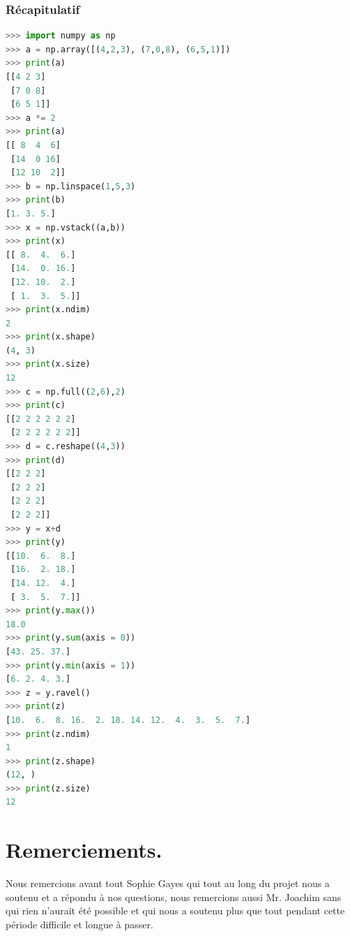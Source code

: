 \documentclass[a4paper, 12pt]{article}
\numberwithin{equation}{subsection}
\begin{document}
\subsubsection{Récapitulatif}
\begin{lstlisting}[language=Python]
>>> import numpy as np
>>> a = np.array([(4,2,3), (7,0,8), (6,5,1)])
>>> print(a)
[[4 2 3]
 [7 0 8]
 [6 5 1]]
>>> a *= 2
>>> print(a)
[[ 8  4  6]
 [14  0 16]
 [12 10  2]]
>>> b = np.linspace(1,5,3)
>>> print(b)
[1. 3. 5.]
>>> x = np.vstack((a,b))
>>> print(x)
[[ 8.  4.  6.]
 [14.  0. 16.]
 [12. 10.  2.]
 [ 1.  3.  5.]]
>>> print(x.ndim)
2
>>> print(x.shape)
(4, 3)
>>> print(x.size)
12
>>> c = np.full((2,6),2)
>>> print(c)
[[2 2 2 2 2 2]
 [2 2 2 2 2 2]]
>>> d = c.reshape((4,3))
>>> print(d)
[[2 2 2]
 [2 2 2]
 [2 2 2]
 [2 2 2]]
>>> y = x+d
>>> print(y)
[[10.  6.  8.]
 [16.  2. 18.]
 [14. 12.  4.]
 [ 3.  5.  7.]]
>>> print(y.max())
18.0
>>> print(y.sum(axis = 0))
[43. 25. 37.]
>>> print(y.min(axis = 1))
[6. 2. 4. 3.]
>>> z = y.ravel()
>>> print(z)
[10.  6.  8. 16.  2. 18. 14. 12.  4.  3.  5.  7.]
>>> print(z.ndim)
1
>>> print(z.shape)
(12, )
>>> print(z.size)
12
\end{lstlisting}
\newpage
\section{Remerciements.}

Nous remercions avant tout Sophie Gayes qui tout au long du projet nous a soutenu et a répondu à nos questions, nous remercions aussi Mr. Joachim sans qui rien n'aurait été possible et qui nous a soutenu plus que tout pendant cette période difficile et longue à passer.
\end{document}
